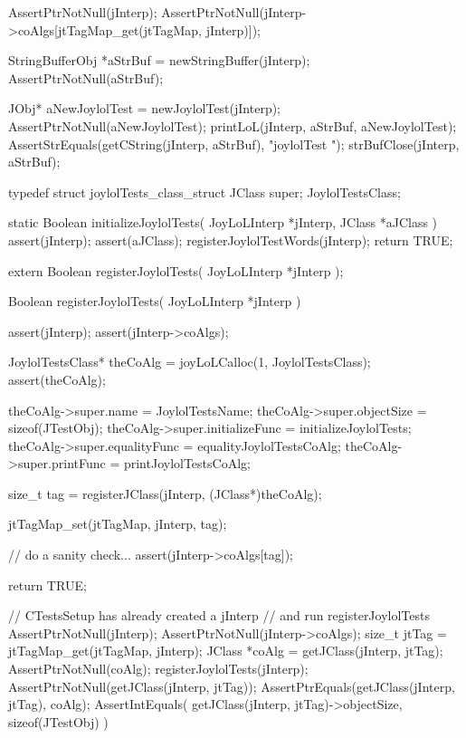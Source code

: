 
\startCTest
  AssertPtrNotNull(jInterp);
  AssertPtrNotNull(jInterp->coAlgs[jtTagMap_get(jtTagMap, jInterp)]);

  StringBufferObj *aStrBuf = newStringBuffer(jInterp);
  AssertPtrNotNull(aStrBuf);
  
  JObj* aNewJoylolTest = newJoylolTest(jInterp);
  AssertPtrNotNull(aNewJoylolTest);
  printLoL(jInterp, aStrBuf, aNewJoylolTest);
  AssertStrEquals(getCString(jInterp, aStrBuf), "joylolTest ");
  strBufClose(jInterp, aStrBuf);
\stopCTest
\stopTestCase
\stopTestSuite

\startTestSuite[registerJoylolTests]

\startCHeader
typedef struct joylolTests_class_struct {
  JClass         super;
} JoylolTestsClass;

\stopCHeader

\startCCode
static Boolean initializeJoylolTests(
  JoyLoLInterp *jInterp,
  JClass       *aJClass
) {
  assert(jInterp);
  assert(aJClass);
  registerJoylolTestWords(jInterp);
  return TRUE;
}
\stopCCode

\startCHeader
extern Boolean registerJoylolTests(
  JoyLoLInterp *jInterp
);
\stopCHeader
{}

\startCCode
Boolean registerJoylolTests(
  JoyLoLInterp *jInterp
) {
  assert(jInterp);
  assert(jInterp->coAlgs);
  
  JoylolTestsClass* theCoAlg
    = joyLoLCalloc(1, JoylolTestsClass);
  assert(theCoAlg);
  
  theCoAlg->super.name           = JoylolTestsName;
  theCoAlg->super.objectSize     = sizeof(JTestObj);
  theCoAlg->super.initializeFunc = initializeJoylolTests;
  theCoAlg->super.equalityFunc   = equalityJoylolTestsCoAlg;
  theCoAlg->super.printFunc      = printJoylolTestsCoAlg;
  
  size_t tag =
    registerJClass(jInterp, (JClass*)theCoAlg);
  
  jtTagMap_set(jtTagMap, jInterp, tag);
  
  // do a sanity check...
  assert(jInterp->coAlgs[tag]);
   
  return TRUE;
}
\stopCCode


\startCTest
  // CTestsSetup has already created a jInterp
  // and run registerJoylolTests
  AssertPtrNotNull(jInterp);
  AssertPtrNotNull(jInterp->coAlgs);
  size_t jtTag = jtTagMap_get(jtTagMap, jInterp);
  JClass *coAlg = getJClass(jInterp, jtTag);
  AssertPtrNotNull(coAlg);
  registerJoylolTests(jInterp);
  AssertPtrNotNull(getJClass(jInterp, jtTag));
  AssertPtrEquals(getJClass(jInterp, jtTag), coAlg);
  AssertIntEquals(
    getJClass(jInterp, jtTag)->objectSize,
    sizeof(JTestObj)
  )
\stopCTest
\stopTestCase
\stopTestSuite